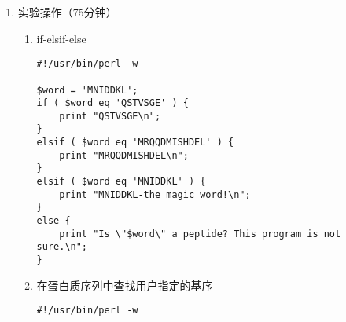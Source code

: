 \documentclass{TIJMUjiaoanSY}
\begin{document}
\firstTail

\newpage
\otherHeader

\begin{enumerate}
\vspace{-1em}
\vspace{-1em}
  \item 实验操作（75分钟）
    \begin{enumerate}
      \item if-elsif-else
\begin{verbatim}
#!/usr/bin/perl -w

$word = 'MNIDDKL';
if ( $word eq 'QSTVSGE' ) {
    print "QSTVSGE\n";
}
elsif ( $word eq 'MRQQDMISHDEL' ) {
    print "MRQQDMISHDEL\n";
}
elsif ( $word eq 'MNIDDKL' ) {
    print "MNIDDKL-the magic word!\n";
}
else {
    print "Is \"$word\" a peptide? This program is not sure.\n";
}
\end{verbatim}

      \item 在蛋白质序列中查找用户指定的基序
\begin{verbatim}
#!/usr/bin/perl -w


\end{verbatim}
\end{enumerate}
\end{enumerate}
\end{document}
